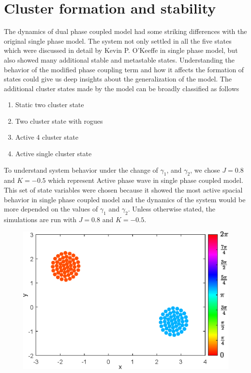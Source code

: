 \documentclass[twocolumn,10pt]{asme2ej}
\begin{document}



\section{Cluster formation and stability}
{
    The dynamics of dual phase coupled model had some striking differences with the original single phase model. The system not only settled in all the five states which were discussed in detail by Kevin P. O'Keeffe in single phase model, but also showed many additional stable and metastable states. Understanding the behavior of the modified phase coupling term and how it affects the formation of states could give us deep insights about the generalization of the model.
    The additional cluster states made by the model can be broadly classified as follows 
    \begin{enumerate}[label = (\alph*)]
        \item Static two cluster state
        \item Two cluster state with rogues 
        \item Active 4 cluster state
        \item Active single cluster state
    \end{enumerate}
    \noindent
    To understand system behavior under the change of \(\gamma_1\), and \(\gamma_2\), we chose \(J = 0.8\) and \(K = -0.5\) which represent Active phase wave in single phase coupled model. This set of state variables were chosen because it showed the most active spacial behavior in single phase coupled model and the dynamics of the system would be more depended on the values of \(\gamma_1\) and \(\gamma_2\). Unless otherwise stated, the simulations are run with \(J = 0.8\) and \(K = -0.5\). 
    \begin{figure}[h!]
        \includegraphics[width = \linewidth]{TwoCluster.eps}

\end{figure}}
\end{document}
